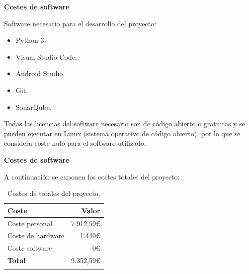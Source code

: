 \textbf{Costes de software}

Software necesario para el desarrollo del proyecto:

\begin{itemize}
\item
	Python 3.
\item
	Visual Studio Code.
\item
	Android Studio.
\item
	Git.
\item
	SonarQube.
\end{itemize}

Todas las licencias del software necesario son de código abierto o gratuitas y se pueden ejecutar en Linux (sistema operativo de código abierto), por lo que se considera coste nulo para el software utilizado.

\textbf{Costes de software}

A continuación se exponen los costes totales del proyecto:

\begin{longtable}[]{@{}lr@{}}
\toprule
\begin{minipage}[b]{0.38\columnwidth}\raggedright\strut
\textbf{Coste}\strut
\end{minipage} & \begin{minipage}[b]{0.20\columnwidth}\raggedright\strut
\textbf{Valor}\strut
\end{minipage}\tabularnewline
\midrule
\endhead
\begin{minipage}[t]{0.38\columnwidth}\raggedright\strut
Coste personal\strut
\end{minipage} & \begin{minipage}[t]{0.20\columnwidth}\raggedright\strut
7.912,59\euro{}\strut
\end{minipage}\tabularnewline
\begin{minipage}[t]{0.38\columnwidth}\raggedright\strut
Coste de hardware\strut
\end{minipage} & \begin{minipage}[t]{0.20\columnwidth}\raggedright\strut
1.440\euro{}\strut
\end{minipage}\tabularnewline
\begin{minipage}[t]{0.38\columnwidth}\raggedright\strut
Coste software\strut
\end{minipage} & \begin{minipage}[t]{0.20\columnwidth}\raggedright\strut
0\euro{}\strut
\end{minipage}\tabularnewline
\midrule
\begin{minipage}[t]{0.38\columnwidth}\raggedright\strut
\textbf{Total}\strut
\end{minipage} & \begin{minipage}[t]{0.20\columnwidth}\raggedright\strut
9.352,59\euro{}\strut
\end{minipage}\tabularnewline
\bottomrule
\caption{Costes de totales del proyecto.}
\end{longtable}

